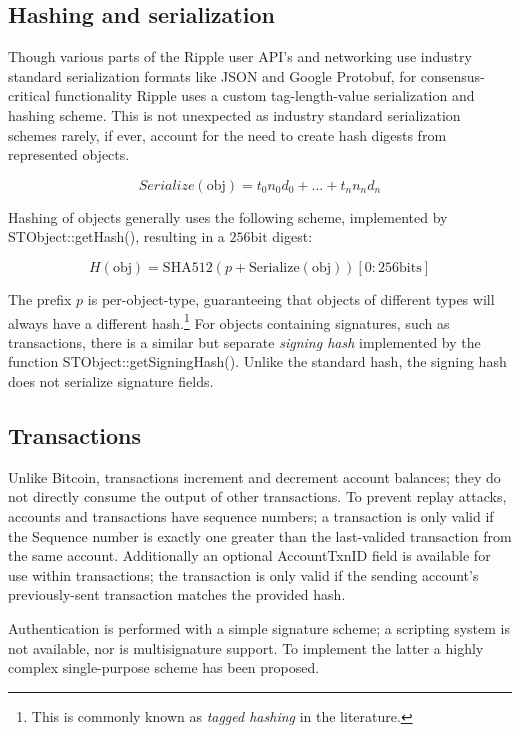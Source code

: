 \documentclass{article}
\begin{document}
\subsection{Hashing and serialization}

Though various parts of the Ripple user API's and networking use industry
standard serialization formats like JSON and Google Protobuf, for
consensus-critical functionality Ripple uses a custom tag-length-value
serialization and hashing scheme. This is not unexpected as industry standard
serialization schemes rarely, if ever, account for the need to create hash
digests from represented objects.

\begin{equation}
    \textit{Serialize}(\text{obj}) = t_0 n_0 d_0 + \hdots + t_n n_n d_n
\end{equation}

Hashing of objects generally uses the following scheme, implemented by
STObject::getHash(), resulting in a $256\text{bit}$ digest:

\begin{equation}
    H(\text{obj}) = \text{SHA512}(p + \text{Serialize}(\text{obj}))[0:256\text{bits}]
\end{equation}

The prefix $p$ is per-object-type, guaranteeing that objects of different types
will always have a different hash.\footnote{This is commonly known as
\emph{tagged hashing} in the literature.} For objects containing signatures,
such as transactions, there is a similar but separate \emph{signing hash}
implemented by the function STObject::getSigningHash(). Unlike the standard
hash, the signing hash does not serialize signature fields.


\subsection{Transactions}

Unlike Bitcoin, transactions increment and decrement account balances; they do
not directly consume the output of other transactions. To prevent replay
attacks, accounts and transactions have sequence numbers; a transaction is only
valid if the Sequence number is exactly one greater than the last-valided
transaction from the same account. Additionally an optional AccountTxnID field
is available for use within transactions; the transaction is only valid if the
sending account's previously-sent transaction matches the provided hash.

Authentication is performed with a simple signature scheme; a scripting system
is not available, nor is multisignature support. To implement the latter a
highly complex single-purpose scheme\cite{ripple-wiki-multisign} has been
proposed.
\end{document}

